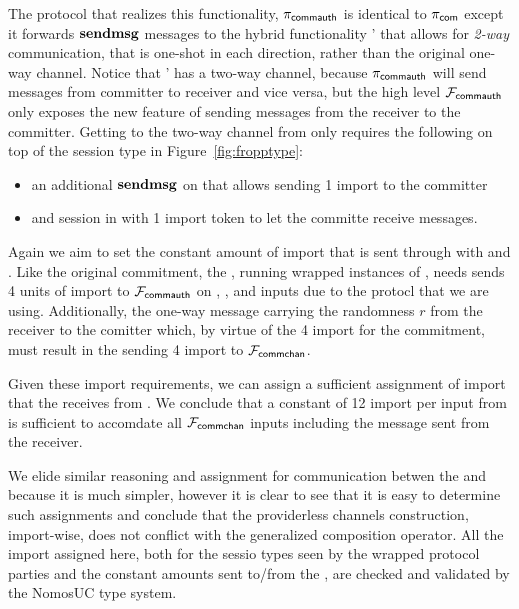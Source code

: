 The protocol that realizes this functionality, $\pi_{{\mathsf {commauth}}}$ is identical to $\pi_{{\mathsf {com}}}$ except it forwards $\mathbf{sendmsg}$ messages to the hybrid functionality \Fropp' that allows for \emph{2-way} communication, that is one-shot in each direction, rather than the original one-way channel. 
Notice that \Fropp' has a two-way channel, because $\pi_{{\mathsf {commauth}}}$ will send messages from committer to receiver and vice versa, but the high level $\mathcal{F}_{{\mathsf {commauth}}}$ only exposes the new feature of sending messages from the receiver to the committer. 
Getting to the two-way channel from \Fropp only requires the following on top of the session type in Figure~\ref{fig:fropptype}: 
\begin{itemize}
	\item an additional $\mathbf{sendmsg}$ on  that allows sending 1 import to the committer
	\item and  session in  with 1 import token to let the committe receive messages.
\end{itemize}

Again we aim to set the constant amount of import that is sent through \partywrapper with \Z and \F. 
Like the original commitment, the \partywrapper, running wrapped instances of , needs sends 4 units of import to $\mathcal{F}_{{\mathsf {commauth}}}$ on , , and  inputs due to the protocl that we are using. 
Additionally, the one-way message carrying the randomness $r$ from the receiver to the comitter which, by virtue of the 4 import for the commitment, must result in the \partywrapper sending 4 import to $\mathcal{F}_{{\mathsf {commchan}}}$.

Given these import requirements, we can assign a sufficient assignment of import that the \partywrapper receives from \Z. 
We conclude that a constant of 12 import per input from \Z is sufficient to accomdate all $\mathcal{F}_{{\mathsf {commchan}}}$ inputs including the message sent from the receiver. 

We elide similar reasoning and assignment for communication betwen the \partywrapper and \A because it is much simpler, however it is clear to see that it is easy to determine such assignments and conclude that the providerless channels construction, import-wise, does not conflict with the generalized composition operator.
All the import assigned here, both for the sessio types seen by the wrapped protocol parties and the constant amounts sent to/from the \partywrapper, are checked and validated by the NomosUC type system. 

